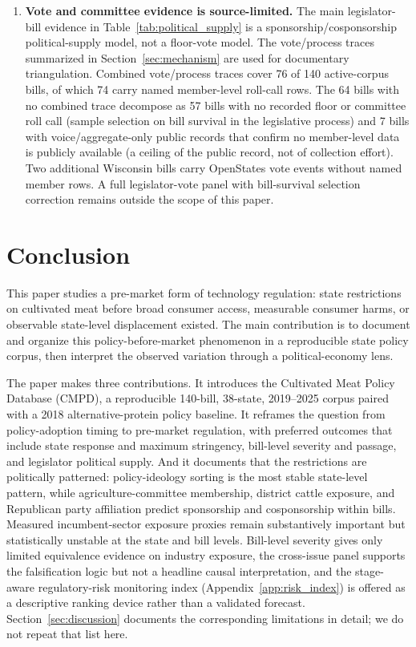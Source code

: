 \documentclass[12pt]{article}
\begin{document}
\begin{enumerate}
    \item \textbf{Vote and committee evidence is source-limited.}  The main legislator-bill evidence in Table~\ref{tab:political_supply} is a sponsorship/cosponsorship political-supply model, not a floor-vote model.  The vote/process traces summarized in Section~\ref{sec:mechanism} are used for documentary triangulation.  Combined vote/process traces cover 76 of 140 active-corpus bills, of which 74 carry named member-level roll-call rows.  The 64 bills with no combined trace decompose as 57 bills with no recorded floor or committee roll call (sample selection on bill survival in the legislative process) and 7 bills with voice/aggregate-only public records that confirm no member-level data is publicly available (a ceiling of the public record, not of collection effort).  Two additional Wisconsin bills carry OpenStates vote events without named member rows.  A full legislator-vote panel with bill-survival selection correction remains outside the scope of this paper.
\end{enumerate}

\section{Conclusion}

This paper studies a pre-market form of technology regulation: state restrictions on cultivated meat before broad consumer access, measurable consumer harms, or observable state-level displacement existed.  The main contribution is to document and organize this policy-before-market phenomenon in a reproducible state policy corpus, then interpret the observed variation through a political-economy lens.

The paper makes three contributions.  It introduces the Cultivated Meat Policy Database (CMPD), a reproducible 140-bill, 38-state, 2019--2025 corpus paired with a 2018 alternative-protein policy baseline.  It reframes the question from policy-adoption timing to pre-market regulation, with preferred outcomes that include state response and maximum stringency, bill-level severity and passage, and legislator political supply.  And it documents that the restrictions are politically patterned: policy-ideology sorting is the most stable state-level pattern, while agriculture-committee membership, district cattle exposure, and Republican party affiliation predict sponsorship and cosponsorship within bills.  Measured incumbent-sector exposure proxies remain substantively important but statistically unstable at the state and bill levels.  Bill-level severity gives only limited equivalence evidence on industry exposure, the cross-issue panel supports the falsification logic but not a headline causal interpretation, and the stage-aware regulatory-risk monitoring index (Appendix~\ref{app:risk_index}) is offered as a descriptive ranking device rather than a validated forecast.  Section~\ref{sec:discussion} documents the corresponding limitations in detail; we do not repeat that list here.
\end{document}
